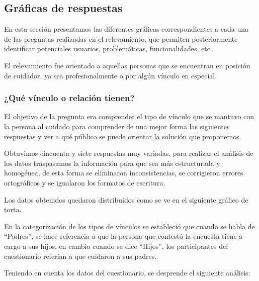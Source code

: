 \documentclass[a4paper,12pt]{article}
\newcommand{\saltolinea}{\par\vspace{\baselineskip}}
\begin{document}
    \subsection{Gráficas de respuestas}
    \par En esta sección presentamos las diferentes gráficas correspondientes a cada una de las preguntas realizadas en el relevamiento, que permiten posteriormente identificar potenciales usuarios, problemáticas, funcionalidades, etc.
    \par El relevamiento fue orientado a aquellas personas que se encuentran en posición de cuidador, ya sea profesionalmente o por algún vínculo en especial.
    \subsubsection{¿Qué vínculo o relación tienen?}
    \par El objetivo de la pregunta era comprender el tipo de vínculo que se mantuvo con la persona al cuidado para comprender de una mejor forma las siguientes respuestas y ver a qué público se puede orientar la solución que proponemos.
    \par Obtuvimos cincuenta y siete respuestas muy variadas, para realizar el análisis de los datos traspasamos la información para que sea más estructurada y homogénea, de esta forma se eliminaron inconsistencias, se corrigieron errores ortográficos y se igualaron los formatos de escritura.
    \par Los datos obtenidos quedaron distribuidos como se ve en el siguiente gráfico de torta. \newline
    \saltolinea
    \par En la categorización de los tipos de vínculos se estableció que cuando se habla de “Padres”, se hace referencia a que la persona que contestó la encuesta tiene a cargo a sus hijos, en cambio cuando se dice “Hijos”, los participantes del cuestionario referían a que cuidaron a sus padres.
    \par Teniendo en cuenta los datos del cuestionario, se desprende el siguiente análisis:
\end{document}

